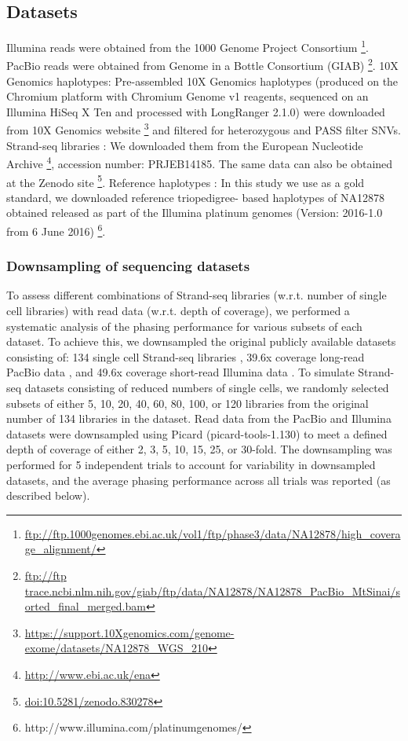 \subsection{Datasets} 
Illumina reads \citep{sudmant2015integrated, 10002015global} were obtained from the 1000 Genome Project Consortium \footnote{\url{ftp://ftp.1000genomes.ebi.ac.uk/vol1/ftp/phase3/data/NA12878/high_coverage_alignment/}}. 
PacBio reads \citep{giab} were obtained from Genome in a Bottle Consortium (GIAB) \footnote{\url{ftp://ftp trace.ncbi.nlm.nih.gov/giab/ftp/data/NA12878/NA12878_PacBio_MtSinai/sorted_final_merged.bam}}. 
10X Genomics haplotypes: Pre-assembled 10X Genomics haplotypes (produced on the Chromium platform with Chromium Genome v1 reagents, sequenced on an Illumina HiSeq X Ten and processed with LongRanger 2.1.0) were downloaded from 
10X Genomics website \footnote{\url{https://support.10Xgenomics.com/genome-exome/datasets/NA12878_WGS_210}} and filtered for heterozygous and PASS filter SNVs. 
Strand-seq libraries \citep{Porubsky2016}: We downloaded them from the European Nucleotide Archive \footnote{\url{http://www.ebi.ac.uk/ena}}, accession number: PRJEB14185. 
The same data can also be obtained at the Zenodo site \footnote{\url{doi:10.5281/zenodo.830278}}. 
Reference haplotypes \citep{eberle2017reference}: In this study we use as a gold standard, we downloaded reference triopedigree- based haplotypes of NA12878 obtained released as part of the Illumina platinum genomes (Version: 2016-1.0 from 6 June 2016) \footnote{http://www.illumina.com/platinumgenomes/}.


\subsubsection{Downsampling of sequencing datasets}
	To assess different combinations of Strand-seq libraries (w.r.t. number of single cell libraries) with read data (w.r.t. depth of coverage), 
	we performed a systematic analysis of the phasing performance for various subsets of each dataset. 
	To achieve this, we downsampled the  original publicly available datasets consisting of: 134 single cell Strand-seq libraries \citep{Porubsky2016}, 
	39.6x coverage long-read PacBio data \citep{giab}, and 49.6x coverage short-read Illumina data \citep{sudmant2015integrated, 10002015global}. 
	To simulate Strand-seq datasets consisting of reduced numbers of single cells, we randomly selected subsets of either 5, 10, 20, 40, 60, 80, 100, or 120 libraries from the original number of 134  libraries in the dataset. 
	Read data from the PacBio and Illumina datasets were downsampled using Picard (picard-tools-1.130) to meet a defined depth of coverage of either 2, 3, 5, 10, 15, 25, or 30-fold. 
	The downsampling was performed for 5 independent trials to account for variability in downsampled datasets, and the average phasing performance across all trials was reported (as described below).

